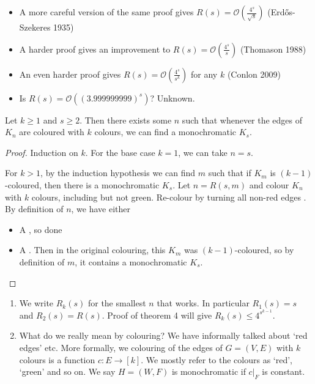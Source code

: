 \documentclass{article}
\begin{document}
\begin{remark}
    \leavevmode
    \begin{itemize}
        \item A more careful version of the same proof gives $R(s) = \mathcal{O} \left(\frac{4^s}{\sqrt{s}}\right)$ (Erd\H{o}s-Szekeres 1935)
        \item A harder proof gives an improvement to $R(s) = \mathcal{O}\left(\frac{4^s}{s}\right)$ (Thomason 1988)
        \item An even harder proof gives $R(s) = \mathcal{O}\left(\frac{4^s}{s^k}\right)$ for any $k$ (Conlon 2009)
        \item Is $R(s) = \mathcal{O}\left((3.999999999)^s\right)$? Unknown.
    \end{itemize}
\end{remark}

\begin{nthm}\label{thm:multiRamsey}
    Let $k \geq 1$ and $s \geq 2$. Then there exists some $n$ such that whenever the edges of $K_n$ are coloured with $k$ colours, we can find a monochromatic $K_s$.
\end{nthm}

\begin{proof}
    Induction on $k$. For the base case $k=1$, we can take $n=s$.

    For $k>1$, by the induction hypothesis we can find $m$ such that if $K_m$ is $(k-1)$-coloured, then there is a monochromatic $K_s$.
    Let $n = R(s, m)$ and colour $K_n$ with $k$ colours, including  but not green.
    Re-colour by turning all non-red edges .
    By definition of $n$, we have either
    \begin{itemize}
        \item A , so done
        \item A . Then in the original colouring, this $K_m$ was $(k-1)$-coloured, so by definition of $m$, it contains a monochromatic $K_s$.
    \end{itemize}
\end{proof}

\begin{remark}
    \leavevmode
    \begin{enumerate} %
        \item We write $R_k(s)$ for the smallest $n$ that works. In particular $R_1(s) = s$ and $R_2(s) = R(s)$.
            Proof of theorem 4 will give $R_k(s) \leq 4^{s^{k-1}}$.
        \item What do we really mean by colouring?
            We have informally talked about `red edges' etc. More formally, we colouring of the edges of $G = (V, E)$ with $k$ colours is a function $c: E \to [k]$. We mostly refer to the colours as `red', `green' and so on.
            We say $H = (W, F)$ is monochromatic if $c |_F$ is constant.
    \end{enumerate}
\end{remark}
\end{document}
